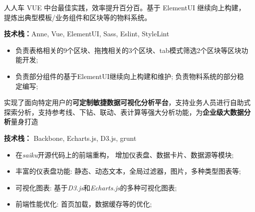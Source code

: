 \documentclass{resume}
\begin{document}



\begin{onehalfspacing}
人人车 VUE 中台最佳实践，效率提升百分百。基于 ElementUI 继续向上构建，提炼出典型模板/业务组件和区块等的物料系统。


\textbf{技术栈：}Anne, Vue, ElementUI, Sass, Eslint, StyleLint
\begin{itemize}
  \item 负责表格相关的9个区块、拖拽相关的3个区块、tab模式筛选2个区块等区块功能开发;
  \item 负责部分组件的基于ElementUI继续向上构建和维护; 负责物料系统的部分稳定编写;
\end{itemize}
\end{onehalfspacing}


\begin{onehalfspacing}
实现了面向特定用户的\textbf{可定制敏捷数据可视化分析平台}，支持业务人员进行自助式探索分析，支持参考线、下钻、联动、表计算等强大分析功能，为\textbf{企业级大数据分析}量身打造


\textbf{技术栈：} Backbone, Echarts.js, D3.js, grunt
\begin{itemize}
  \item 在\textit{saiku}开源代码上的前端重构， 增加仪表盘、数据卡片、数据源等模块;
  \item 丰富的仪表盘功能: 静态、动态文本，全局过滤器，图片，多种类型图表等;
  \item 可视化图表: 基于\textit{D3.js}和\textit{Echarts.js}的多种可视化图表;
  \item 前端性能优化: 首页加载，数据缓存等的优化;
\end{itemize}
\end{onehalfspacing}
\end{document}
